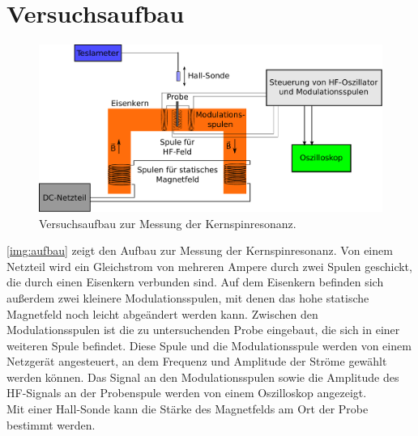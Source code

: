 \section{Versuchsaufbau}

\begin{figure}[H]
\begin{center}
  \includegraphics[width=\textwidth]{../img/aufbau.pdf}
  \caption{Versuchsaufbau zur Messung der Kernspinresonanz.}
  \label{img:aufbau}
\end{center}
\end{figure}

\autoref{img:aufbau} zeigt den Aufbau zur Messung der Kernspinresonanz.
Von einem Netzteil wird ein Gleichstrom von mehreren Ampere durch zwei Spulen geschickt,
die durch einen Eisenkern verbunden sind.
Auf dem Eisenkern befinden sich außerdem zwei kleinere Modulationsspulen,
mit denen das hohe statische Magnetfeld noch leicht abgeändert werden kann.
Zwischen den Modulationsspulen ist die zu untersuchenden Probe eingebaut,
die sich in einer weiteren Spule befindet.
Diese Spule und die Modulationsspule werden von einem Netzgerät angesteuert,
an dem Frequenz und Amplitude der Ströme gewählt werden können.
Das Signal an den Modulationsspulen sowie die Amplitude des HF-Signals an der Probenspule
werden von einem Oszilloskop angezeigt.\\
Mit einer Hall-Sonde kann die Stärke des Magnetfelds am Ort der Probe bestimmt werden.